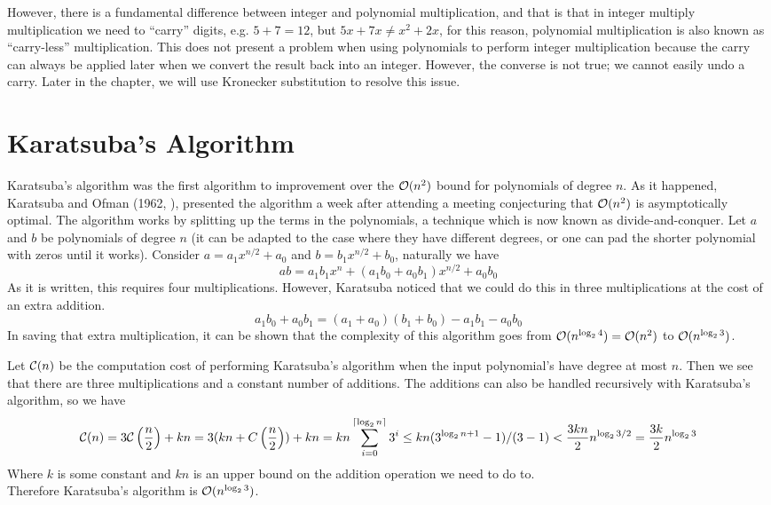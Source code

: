 However, there is a fundamental difference between integer and polynomial multiplication, and that is that in integer multiply multiplication we need to ``carry'' digits, e.g. $5 + 7 = 12$, but $5x + 7x \neq x^2 + 2x$, for this reason, polynomial multiplication is also known as ``carry-less'' multiplication. This does not present a problem when using polynomials to perform integer multiplication because the carry can always be applied later when we convert the result back into an integer. However, the converse is not true; we cannot easily undo a carry. Later in the chapter, we will use Kronecker substitution to resolve this issue.

\section{Karatsuba's Algorithm}
\label{sec:prelim-karatsuba}

Karatsuba's algorithm was the first algorithm to improvement over the $\mathcal O(n^2)$ bound for polynomials of degree $n$. As it happened, Karatsuba and Ofman (1962, \cite{karatsuba}), presented the algorithm a week after attending a meeting conjecturing that $\mathcal O(n^2)$ is asymptotically optimal. The algorithm works by splitting up the terms in the polynomials, a technique which is now known as divide-and-conquer. Let $a$ and $b$ be polynomials of degree $n$ (it can be adapted to the case where they have different degrees, or one can pad the shorter polynomial with zeros until it works). Consider $a = a_1x^{n/2} + a_0$ and $b = b_1x^{n/2} + b_0$, naturally we have
\[
    ab = a_1b_1x^n + (a_1b_0 + a_0b_1)x^{n/2} + a_0b_0
\]
As it is written, this requires four multiplications. However, Karatsuba noticed that we could do this in three multiplications at the cost of an extra addition.
\[
    a_1b_0 + a_0b_1 = (a_1 + a_0)(b_1 + b_0) - a_1b_1 - a_0b_0
\]
In saving that extra multiplication, it can be shown that the complexity of this algorithm goes from $\mathcal O(n^{\log_2 4}) = \mathcal O(n^2)$ to $\mathcal O(n^{\log_2 3})$.

Let $\mathcal C(n)$ be the computation cost of performing Karatsuba's algorithm when the input polynomial's have degree at most $n$. Then we see that there are three multiplications and a constant number of additions. The additions can also be handled recursively with Karatsuba's algorithm, so we have
\[
    \mathcal C(n) = 3\mathcal C\left(\frac{n}{2}\right) + kn = 3(kn + C\left(\frac{n}{2}\right)) + kn = kn\sum^{\lceil \log_2 n\rceil}_{i=0} 3^i \leq kn(3^{\log_2 n + 1} - 1)/(3 - 1) < \frac{3kn}{2}n^{\log_2 3/2} = \frac{3k}{2}n^{\log_2 3}
\]
Where $k$ is some constant and $kn$ is an upper bound on the addition operation we need to do to.\\
Therefore Karatsuba's algorithm is $\mathcal O(n^{\log_2 3})$.

